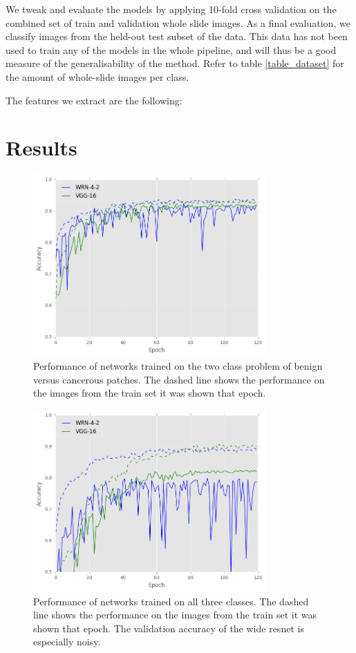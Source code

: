 \documentclass[journal]{IEEEtran}
\begin{document}
We tweak and evaluate the models by applying 10-fold cross validation on the combined set of train and validation whole slide images. As a final evaluation, we classify images from the held-out test subset of the data. This data has not been used to train any of the models in the whole pipeline, and will thus be a good measure of the generalisability of the method. Refer to table \ref{table_dataset} for the amount of whole-slide images per class.

The features we extract are the following:

\section{Results}

\begin{figure}[!t]
\centering{}
\hspace{-0.3cm}\includegraphics[width=3.5in]{2class_performance}
\vspace{-0.35cm}\caption{Performance of networks trained on the two class problem of benign versus cancerous patches. The dashed line shows the performance on the images from the train set it was shown that epoch.}
\label{fig_2class}
\end{figure}

\begin{figure}[!t]
\centering{}
\hspace{-0.3cm}\includegraphics[width=3.5in]{3class_performance}
\vspace{-0.35cm}\caption{Performance of networks trained on all three classes. The dashed line shows the performance on the images from the train set it was shown that epoch. The validation accuracy of the wide resnet is especially noisy.}
\label{fig_3class}
\end{figure}
\end{document}
